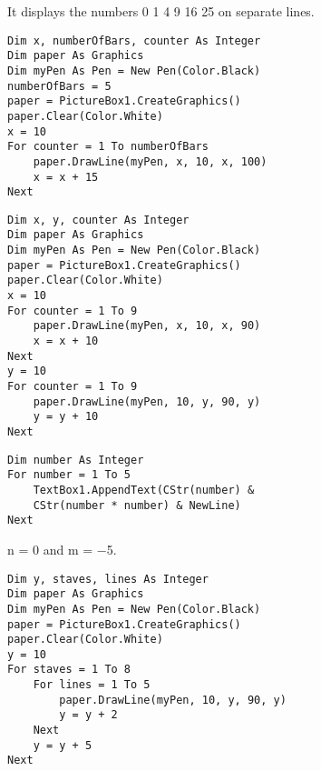 		\begin{stab}
			\begin{enumChapter}
				\item	It displays the numbers 0 1 4 9 16 25 on separate lines.
				\item	\begin{lstlisting}
Dim x, numberOfBars, counter As Integer
Dim paper As Graphics
Dim myPen As Pen = New Pen(Color.Black)
numberOfBars = 5
paper = PictureBox1.CreateGraphics()
paper.Clear(Color.White)
x = 10
For counter = 1 To numberOfBars
	paper.DrawLine(myPen, x, 10, x, 100)	
	x = x + 15
Next
					\end{lstlisting}
				\item
					\begin{lstlisting}
Dim x, y, counter As Integer
Dim paper As Graphics
Dim myPen As Pen = New Pen(Color.Black)
paper = PictureBox1.CreateGraphics()	
paper.Clear(Color.White)
x = 10
For counter = 1 To 9
	paper.DrawLine(myPen, x, 10, x, 90)
	x = x + 10
Next
y = 10
For counter = 1 To 9
	paper.DrawLine(myPen, 10, y, 90, y)
	y = y + 10
Next
					\end{lstlisting}
				\item
					\begin{lstlisting}
Dim number As Integer
For number = 1 To 5
	TextBox1.AppendText(CStr(number) &
	CStr(number * number) & NewLine)
Next
					\end{lstlisting}
				\item	n = 0 and m = −5.
				\item
					\begin{lstlisting}
Dim y, staves, lines As Integer
Dim paper As Graphics
Dim myPen As Pen = New Pen(Color.Black)
paper = PictureBox1.CreateGraphics()
paper.Clear(Color.White)
y = 10
For staves = 1 To 8
	For lines = 1 To 5
		paper.DrawLine(myPen, 10, y, 90, y)
		y = y + 2
	Next
	y = y + 5
Next
					\end{lstlisting}
			\end{enumChapter}
		\end{stab}%
